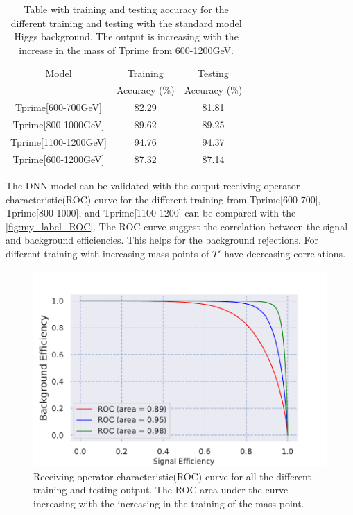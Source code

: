 \begin{table}[H]
    \centering
    \begin{tabular}{|c|c|c|}\hline
    Model     & Training   & Testing  \\
              & Accuracy (\%)  &     Accuracy (\%)  \\\hline
   Tprime[600-700GeV]       &     82.29        &    81.81         \\
   Tprime[800-1000GeV]          &   89.62          &     89.25        \\
   Tprime[1100-1200GeV]          &     94.76        &    94.37         \\
   Tprime[600-1200GeV]          &       87.32      &        87.14     \\\hline
    \end{tabular}
    \caption{Table with training and testing accuracy for the different training and testing with the standard model Higgs background. The output is increasing with the increase in the mass of Tprime from 600-1200GeV.}
    \label{tab:my_label_table_1}
\end{table}




The DNN model can be validated with the output receiving operator characteristic(ROC) curve for the different training from Tprime[600-700], Tprime[800-1000], and Tprime[1100-1200] can be compared with the \autoref{fig:my_label_ROC}. The ROC curve suggest the correlation between the signal and background efficiencies. This helps for the background rejections. For different training with increasing mass points of $T'$ have decreasing correlations. 
\begin{figure}[H]
    \centering
    \includegraphics{Results_outputs/ROC_curve_Comaprision_Different_training.pdf}
    \caption{ Receiving operator characteristic(ROC) curve for all the different training and testing output. The ROC area under the curve increasing with the increasing in the training of the mass point.}
    \label{fig:my_label_ROC}
\end{figure}


